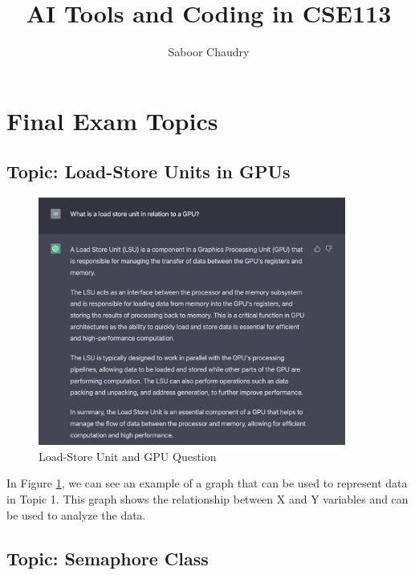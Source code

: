 \documentclass{article}
\begin{document}
\title{AI Tools and Coding in CSE113}
\author{Saboor Chaudry}

\maketitle

\section{Final Exam Topics}

\subsection{Topic: Load-Store Units in GPUs}

\begin{figure}[ht]
  \centering
  \includegraphics[width=0.9\textwidth]{loadstore.png}
  \caption{Load-Store Unit and GPU Question}
  \label{fig:loadstore}
\end{figure}

In Figure \ref{fig:loadstore}, we can see an example of a graph that can be used to represent data in Topic 1. This graph shows the relationship between X and Y variables and can be used to analyze the data.

\subsection{Topic: Semaphore Class}
\end{document}
